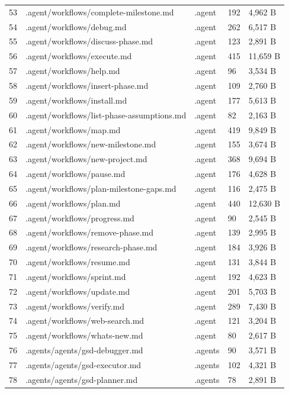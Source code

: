 \documentclass[11pt,a4paper,oneside]{book}
\begin{document}
\begin{longtable}{l l l l l}
53 & .agent/workflows/complete-milestone.md & .agent & 192 & 4,962 B \\
54 & .agent/workflows/debug.md & .agent & 262 & 6,517 B \\
55 & .agent/workflows/discuss-phase.md & .agent & 123 & 2,891 B \\
56 & .agent/workflows/execute.md & .agent & 415 & 11,659 B \\
57 & .agent/workflows/help.md & .agent & 96 & 3,534 B \\
58 & .agent/workflows/insert-phase.md & .agent & 109 & 2,760 B \\
59 & .agent/workflows/install.md & .agent & 177 & 5,613 B \\
60 & .agent/workflows/list-phase-assumptions.md & .agent & 82 & 2,163 B \\
61 & .agent/workflows/map.md & .agent & 419 & 9,849 B \\
62 & .agent/workflows/new-milestone.md & .agent & 155 & 3,674 B \\
63 & .agent/workflows/new-project.md & .agent & 368 & 9,694 B \\
64 & .agent/workflows/pause.md & .agent & 176 & 4,628 B \\
65 & .agent/workflows/plan-milestone-gaps.md & .agent & 116 & 2,475 B \\
66 & .agent/workflows/plan.md & .agent & 440 & 12,630 B \\
67 & .agent/workflows/progress.md & .agent & 90 & 2,545 B \\
68 & .agent/workflows/remove-phase.md & .agent & 139 & 2,995 B \\
69 & .agent/workflows/research-phase.md & .agent & 184 & 3,926 B \\
70 & .agent/workflows/resume.md & .agent & 131 & 3,844 B \\
71 & .agent/workflows/sprint.md & .agent & 192 & 4,623 B \\
72 & .agent/workflows/update.md & .agent & 201 & 5,703 B \\
73 & .agent/workflows/verify.md & .agent & 289 & 7,430 B \\
74 & .agent/workflows/web-search.md & .agent & 121 & 3,204 B \\
75 & .agent/workflows/whats-new.md & .agent & 80 & 2,617 B \\
76 & .agents/agents/gsd-debugger.md & .agents & 90 & 3,571 B \\
77 & .agents/agents/gsd-executor.md & .agents & 102 & 4,321 B \\
78 & .agents/agents/gsd-planner.md & .agents & 78 & 2,891 B \\

\end{longtable}
\end{document}
